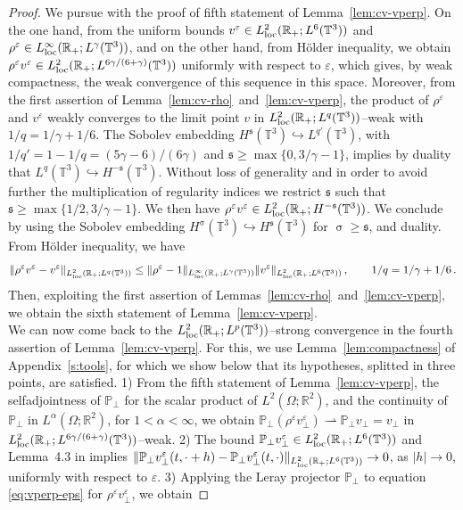 \documentclass[11pt,reqno]{amsart}
\def \R{{\mathbb{R}}}
\def \T{{\mathbb{T}}}
\def \P{{\mathbb{P}}}
\begin{document}
\begin{proof}
    We pursue with the proof of fifth statement of Lemma~\ref{lem:cv-vperp}. On the one hand, from the uniform bounds  $v^\varepsilon \in L_{\rm loc}^2(\R_+; L^6(\T^3))$ and $\rho^\varepsilon \in L_{\rm loc}^\infty(\R_+; L^\gamma(\T^3))$, and on the other hand, from H\"older inequality, we obtain $\rho^\varepsilon v^\varepsilon \in L_{\rm loc}^2(\R_+; L^{6\gamma/(6+\gamma)}(\T^3))$ uniformly with respect to $\varepsilon$, which gives,  by weak compactness, the weak convergence of this sequence in this space. Moreover, from the first assertion of Lemma~\ref{lem:cv-rho}~and~\ref{lem:cv-vperp}, the  product of $\rho^\varepsilon$ and  $v^\varepsilon$ weakly converges to the limit point $v$ in $L_{\rm loc}^2(\R_+; L^q(\T^3))$--weak with $1/q= 1/\gamma + 1/6$. The Sobolev embedding $ H^{\mathfrak s}(\T^3) \hookrightarrow L^{q'}(\T^3)$, with $1/q'=1-1/q=(5\gamma -6)/(6\gamma)$ and $\mathfrak s \geq \max\{0,3/\gamma-1\}$, implies by duality that $L^q (\T^3) \hookrightarrow H^{-\mathfrak s}(\T^3)$. Without loss of generality and in order to avoid further the multiplication of regularity indices we restrict $\mathfrak s$ such that  $\mathfrak s \geq \max\{1/2,3/\gamma-1\}$. We then have $\rho^\varepsilon v^\varepsilon \in L_{\rm loc}^{2}(\R_+; H^{- \mathfrak s}(\T^3))$. We conclude by using the Sobolev embedding $H^{\upsigma}(\T^3) \hookrightarrow H^{\mathfrak s}(\T^3) $ for $\upsigma \geq \mathfrak s$, and duality.\\    
From H\"older inequality, we have
\[
\|\rho^\varepsilon v^\varepsilon -v^\varepsilon \|_{L_{\rm loc}^2(\R_+;L^q(\T^3))} \leq
\|\rho^\varepsilon -1 \|_{L_{\rm loc}^\infty(\R_+;L^\gamma(\T^3))} \|v^\varepsilon\|_{L_{\rm loc}^2(\R_+;L^6(\T^3))}
\, , \qquad 1/q=1/\gamma +1/6 \, .
\]
Then, exploiting the first assertion of Lemmas~\ref{lem:cv-rho}~and~\ref{lem:cv-vperp}, we obtain the sixth statement of Lemma~\ref{lem:cv-vperp}.\\
We can now come back to  the $L_{\rm loc}^2 (\R_+ ;L^p (\T^3)) $--strong convergence in the fourth assertion of Lemma~\ref{lem:cv-vperp}. For this, we use Lemma~\ref{lem:compactness} of Appendix~\ref{s:tools}, for which we show below that its hypotheses, splitted in three points, are satisfied. 1)  From the fifth statement of Lemma~\ref{lem:cv-vperp}, the selfadjointness of $\P_\perp$ for the scalar product of $L^2(\Omega; \R^2)$, and the continuity of $\P_\perp$ in $L^\alpha(\Omega; \R^2)$, for $1<\alpha < \infty$,  we obtain $ \P_\perp(\rho^\varepsilon v_\perp^\varepsilon) \rightharpoonup \P_\perp v_\perp =v_\perp$ in $L_{\rm loc}^2(\R_+; L^{6\gamma/(6+\gamma)}(\T^3))$--weak. 2) The bound $\P_\perp v_\perp^\varepsilon \in  L_{\rm loc}^2(\R_+; L^6(\T^3))$ and Lemma~4.3 in \cite{Bre11} implies $\|\P_\perp v_\perp^\varepsilon (t,\cdot +h )-\P_\perp v_\perp^\varepsilon (t,\cdot )\|_{L_{\rm loc}^2(\R_+; L^6(\T^3))} \rightarrow 0$, as $|h|\rightarrow 0$, uniformly with respect to $\varepsilon$. 3) Applying the Leray projector $\P_\perp$ to equation \eqref{eq:vperp-eps} for $\rho^\varepsilon v_\perp^\varepsilon$, we obtain

\end{proof}
\end{document}
